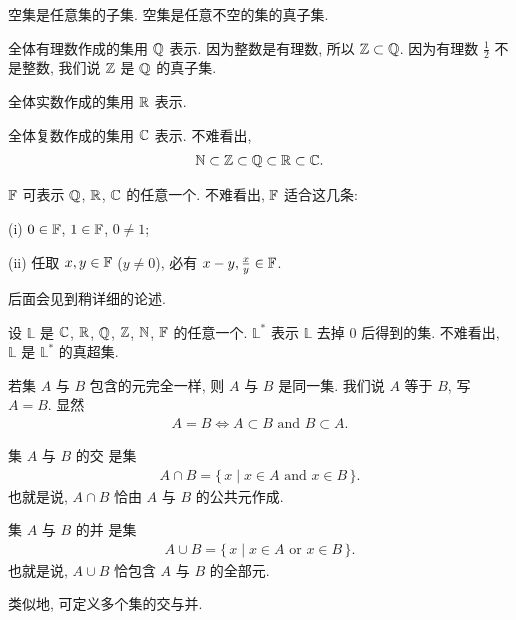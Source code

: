 \begin{example}
    空集是任意集的子集. 空集是任意不空的集的真子集.
\end{example}

\begin{example}
    全体有理数作成的集用 $\mathbb{Q}$  表示. 因为整数是有理数, 所以 $\mathbb{Z} \subset \mathbb{Q}$. 因为有理数 $\frac12$ 不是整数, 我们说 $\mathbb{Z}$ 是 $\mathbb{Q}$ 的真子集.
\end{example}

\begin{definition}
    全体实数作成的集用 $\mathbb{R}$  表示.
\end{definition}

\begin{definition}
    全体复数作成的集用 $\mathbb{C}$  表示. 不难看出,
    \begin{align*}
        \mathbb{N} \subset \mathbb{Z} \subset \mathbb{Q} \subset \mathbb{R} \subset \mathbb{C}.
    \end{align*}
\end{definition}

\begin{definition}
    $\mathbb{F}$  可表示 $\mathbb{Q}$, $\mathbb{R}$, $\mathbb{C}$ 的任意一个. 不难看出, $\mathbb{F}$ 适合这几条:

    (i) $0 \in \mathbb{F}$, $1 \in \mathbb{F}$, $0 \neq 1$;

    (ii) 任取 $x,y \in \mathbb{F}$ ($y \neq 0$), 必有 $x-y, \frac{x}{y} \in \mathbb{F}$.

    后面会见到稍详细的论述.
\end{definition}

\begin{definition}
    设 $\mathbb{L}$ 是 $\mathbb{C}$, $\mathbb{R}$, $\mathbb{Q}$, $\mathbb{Z}$, $\mathbb{N}$, $\mathbb{F}$ 的任意一个. $\mathbb{L}^{\ast}$ 表示 $\mathbb{L}$ 去掉 $0$ 后得到的集. 不难看出, $\mathbb{L}$ 是 $\mathbb{L}^{\ast}$ 的真超集.
\end{definition}

\begin{definition}
    若集 $A$ 与 $B$ 包含的元完全一样, 则 $A$ 与 $B$ 是同一集. 我们说 $A$ 等于 $B$, 写 $A = B$. 显然
    \begin{align*}
        A = B \iff A \subset B \text{ and } B \subset A.
    \end{align*}
\end{definition}

\begin{definition}
    集 $A$ 与 $B$ 的交  是集
    \begin{align*}
        A \cap B = \{\, x \mid x \in A \text{ and } x \in B \,\}.
    \end{align*}
    也就是说, $A \cap B$ 恰由 $A$ 与 $B$ 的公共元作成.

    集 $A$ 与 $B$ 的并  是集
    \begin{align*}
        A \cup B = \{\, x \mid x \in A \text{ or } x \in B \,\}.
    \end{align*}
    也就是说, $A \cup B$ 恰包含 $A$ 与 $B$ 的全部元.

    类似地, 可定义多个集的交与并.
\end{definition}


